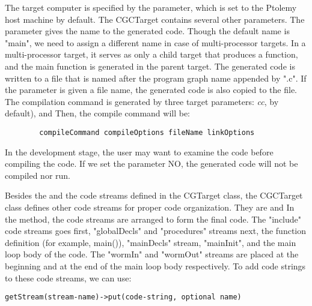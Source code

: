 \begin{ignore}

The target computer is specified
by the
parameter, which is set to the Ptolemy host machine by default.
The CGCTarget contains several other parameters.
The
parameter gives the name to the generated code. Though the default name is
"main", we need to assign a different name in case of multi-processor
targets. In a multi-processor target, it serves as only a child target that
produces a function, and the main function is generated in the parent
target. The generated code is written to a file that is named after the
program graph name appended by ".c". If the
parameter is given a file name, the generated code is also copied to
the file.
The compilation command is generated by three target parameters:
\emph{cc}, by default), 
and 
Then, the compile command will be:

\begin{verbatim}
        compileCommand compileOptions fileName linkOptions
\end{verbatim}

In the development stage, the user may want to examine the code before
compiling the code. If we set the parameter
NO, the generated code will not be compiled nor run.

Besides the
and the
code streams defined in the CGTarget class, the CGCTarget class
defines other code streams for proper code organization.
They are 
and
In the 
method, the code streams are arranged to form the final code.
The "include" code streams goes first, "globalDecls" and
"procedures" streams next,
the function definition (for example, main()), "mainDecls" stream,
"mainInit", and the main loop body of the code. The "wormIn" and
"wormOut" streams are placed at the beginning and at the end of
the main loop body respectively.
To add code strings to these code streams, we can use:

\begin{verbatim}
getStream(stream-name)->put(code-string, optional name)
\end{verbatim}


\end{ignore}
